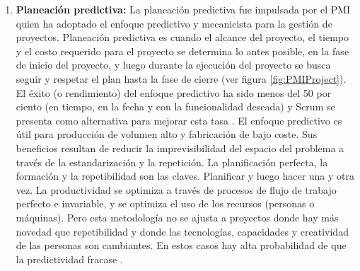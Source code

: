 \begin{enumerate}

\item \textbf{Planeación predictiva:} La planeación predictiva fue impulsada por el PMI quien ha adoptado el enfoque predictivo y mecanicista para la gestión de proyectos. Planeación predictiva es cuando el alcance del proyecto, el tiempo y el costo requerido para el proyecto se determina lo antes posible, en la fase de inicio del proyecto, y luego durante la ejecución del proyecto se busca seguir y respetar el plan hasta la fase de cierre (ver figura \ref{fig:PMIProject}). El éxito (o rendimiento) del enfoque predictivo ha sido menos del 50 por ciento (en tiempo, en la fecha y con la funcionalidad deseada) y Scrum se presenta como alternativa para mejorar esta tasa \cite{Ken-Schwaber-2011}. El enfoque predictivo es útil para producción de volumen alto y fabricación de bajo coste. Sus beneficios resultan de reducir la imprevisibilidad del espacio del problema a través de la estandarización y la repetición. La planificación perfecta, la formación y la repetibilidad son las claves. Planificar y luego hacer una y otra vez. La productividad se optimiza a través de procesos de flujo de trabajo perfecto e invariable, y se optimiza el uso de los recursos (personas o máquinas). Pero esta metodología no se ajusta a proyectos donde hay más novedad que repetibilidad y donde las tecnologías, capacidades y creatividad de las personas son cambiantes. En estos casos hay alta probabilidad de que la predictividad fracase \cite{Ken-Schwaber-2011}.


\end{enumerate}

